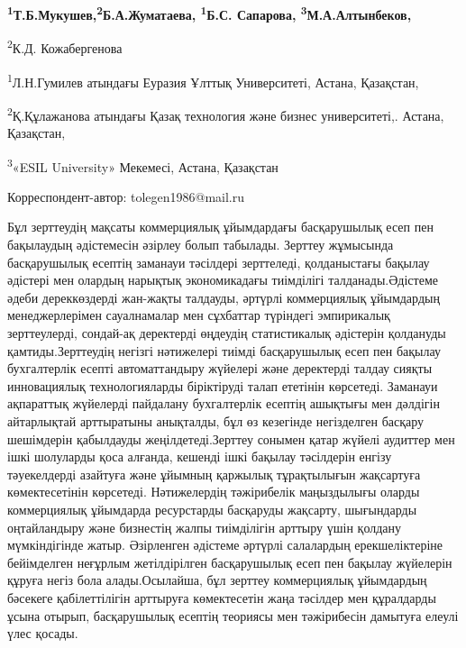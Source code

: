 
\begin{articleheader}

{\bfseries \textsuperscript{1}Т.Б.Мукушев\textsuperscript{\envelope },\textsuperscript{2}Б.А.Жуматаева, \textsuperscript{1}Б.С.
Сапарова, \textsuperscript{3}М.А.Алтынбеков,

\textsuperscript{2}К.Д. Кожабергенова }
\end{articleheader}
\begin{affiliation}

\textsuperscript{1}Л.Н.Гумилев атындағы Еуразия Ұлттық Университеті,
Астана, Қазақстан,

\textsuperscript{2}Қ.Құлажанова атындағы Қазақ технология және бизнес
университеті,. Астана, Қазақстан,

\textsuperscript{3}«ESIL University» Мекемесі, Астана, Қазақстан

\raggedright{\bfseries \textsuperscript{\envelope }}Корреспондент-автор: tolegen1986@mail.ru
\end{affiliation}

Бұл зерттеудің мақсаты коммерциялық ұйымдардағы басқарушылық есеп пен
бақылаудың әдістемесін әзірлеу болып табылады. Зерттеу жұмысында
басқарушылық есептің заманауи тәсілдері зерттеледі, қолданыстағы бақылау
әдістері мен олардың нарықтық экономикадағы тиімділігі
талданады.Әдістеме әдеби дереккөздерді жан-жақты талдауды, әртүрлі
коммерциялық ұйымдардың менеджерлерімен сауалнамалар мен сұхбаттар
түріндегі эмпирикалық зерттеулерді, сондай-ақ деректерді өңдеудің
статистикалық әдістерін қолдануды қамтиды.Зерттеудің негізгі нәтижелері
тиімді басқарушылық есеп пен бақылау бухгалтерлік есепті автоматтандыру
жүйелері және деректерді талдау сияқты инновациялық технологияларды
біріктіруді талап ететінін көрсетеді. Заманауи ақпараттық жүйелерді
пайдалану бухгалтерлік есептің ашықтығы мен дәлдігін айтарлықтай
арттыратыны анықталды, бұл өз кезегінде негізделген басқару шешімдерін
қабылдауды жеңілдетеді.Зерттеу сонымен қатар жүйелі аудиттер мен ішкі
шолуларды қоса алғанда, кешенді ішкі бақылау тәсілдерін енгізу
тәуекелдерді азайтуға және ұйымның қаржылық тұрақтылығын жақсартуға
көмектесетінін көрсетеді. Нәтижелердің тәжірибелік маңыздылығы оларды
коммерциялық ұйымдарда ресурстарды басқаруды жақсарту, шығындарды
оңтайландыру және бизнестің жалпы тиімділігін арттыру үшін қолдану
мүмкіндігінде жатыр. Әзірленген әдістеме әртүрлі салалардың
ерекшеліктеріне бейімделген неғұрлым жетілдірілген басқарушылық есеп пен
бақылау жүйелерін құруға негіз бола алады.Осылайша, бұл зерттеу
коммерциялық ұйымдардың бәсекеге қабілеттілігін арттыруға көмектесетін
жаңа тәсілдер мен құралдарды ұсына отырып, басқарушылық есептің теориясы
мен тәжірибесін дамытуға елеулі үлес қосады.

